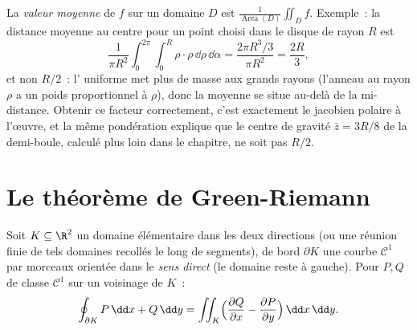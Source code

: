 \begin{example}\label{ex:b2:multint:average}
La \emph{valeur moyenne} de $f$ sur un domaine $D$ est
$\frac1{\operatorname{Area}(D)}\iint_Df$. Exemple~: la distance
moyenne au centre pour un point choisi  dans le
disque de rayon $R$ est
\[
\frac{1}{\pi R^2}\int_0^{2\pi}\!\!\int_0^R
\rho\cdot\rho\,\dd\rho\,\dd\alpha
= \frac{2\pi R^3/3}{\pi R^2} = \frac{2R}3 ,
\]
et non $R/2$~: l' uniforme met plus de masse aux grands rayons
(l'anneau au rayon $\rho$ a un poids proportionnel à $\rho$),
donc la moyenne se situe au-delà de la mi-distance. Obtenir ce
facteur correctement, c'est exactement le jacobien polaire à
l'œuvre, et la même pondération explique que le centre de gravité
$\bar z = 3R/8$ de la demi-boule, calculé plus loin dans le
chapitre, ne soit pas $R/2$.
\end{example}

\section{Le théorème de Green-Riemann}

\begin{theorem}\label{thm:b2:multint:green}
Soit $K \subseteq \R^2$ un domaine  élémentaire dans les
deux directions (ou une réunion finie de tels domaines recollés le
long de segments), de bord $\partial K$ une courbe 
$\mathcal{C}^1$ par morceaux orientée dans le \emph{sens direct} (le
domaine reste à gauche). Pour $P, Q$ de classe $\mathcal{C}^1$ sur un
voisinage de $K$~:
\[
\oint_{\partial K} P\,\dd x + Q\,\dd y
= \iint_K \Bigl(\frac{\partial Q}{\partial x}
- \frac{\partial P}{\partial y}\Bigr)\,\dd x\,\dd y .
\]
\end{theorem}

